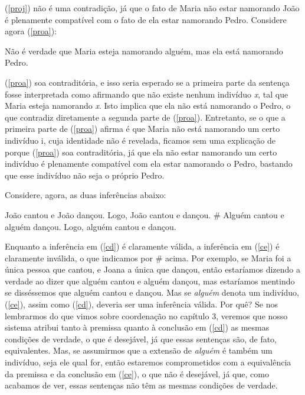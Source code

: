 \n (\ref{proj}) não é uma contradição, já que o fato de Maria não
estar namorando João é plenamente compatível com o fato de ela
estar namorando Pedro. Considere agora (\ref{proa}):

\begin{exe}
\ex Não é verdade que Maria esteja namorando alguém, mas ela está
namorando Pedro.\label{proa}
\end{exe}

\n (\ref{proa}) soa contraditória, e isso seria esperado se a
primeira parte da sentença fosse interpretada como afirmando que
não existe nenhum indivíduo \textit{x}, tal que Maria esteja
namorando \textit{x}. Isto implica que ela não está namorando o
Pedro, o que contradiz diretamente a segunda parte de
(\ref{proa}). Entretanto, se o que a primeira parte de
(\ref{proa}) afirma é que Maria não está namorando um certo
indivíduo i, cuja identidade não é revelada, ficamos sem uma
explicação de porque (\ref{proa}) soa contraditória, já que ela
não estar namorando um certo indivíduo é plenamente compatível com
ela estar namorando o Pedro, bastando que esse indivíduo não seja
o próprio Pedro.

Considere, agora, as duas inferências abaixo:

\begin{exe}
    \ex João cantou e João dançou. Logo, João cantou e dançou.\label{cd}
    \ex \# Alguém cantou e alguém dançou. Logo, alguém cantou e dançou.
    \label{ce}
\end{exe}

\n Enquanto a inferência em (\ref{cd}) é claramente válida, a
inferência em (\ref{ce}) é claramente inválida, o que indicamos por \# acima. Por exemplo, se
Maria foi a única pessoa que cantou, e Joana a única que dançou,
então estaríamos dizendo a verdade ao dizer que alguém cantou e
alguém dançou, mas estaríamos mentindo se disséssemos que alguém
cantou e dançou. Mas se \textit{alguém} denota um indivíduo, (\ref{ce}),
assim como (\ref{cd}), deveria ser uma inferência válida. Por quê?
Se nos lembrarmos do que vimos sobre coordenação no capítulo 3,
veremos que nosso sistema atribui tanto à premissa quanto à
conclusão em (\ref{cd}) as mesmas condições de verdade, o que é
desejável, já que essas sentenças são, de fato, equivalentes. Mas, se assumirmos que a extensão de \textit{alguém} é também um indivíduo,
seja ele qual for, então estaremos comprometidos com a
equivalência da premissa e da conclusão em (\ref{ce}), o que não é
desejável, já que, como acabamos de ver, essas sentenças não têm as
mesmas condições de verdade.

